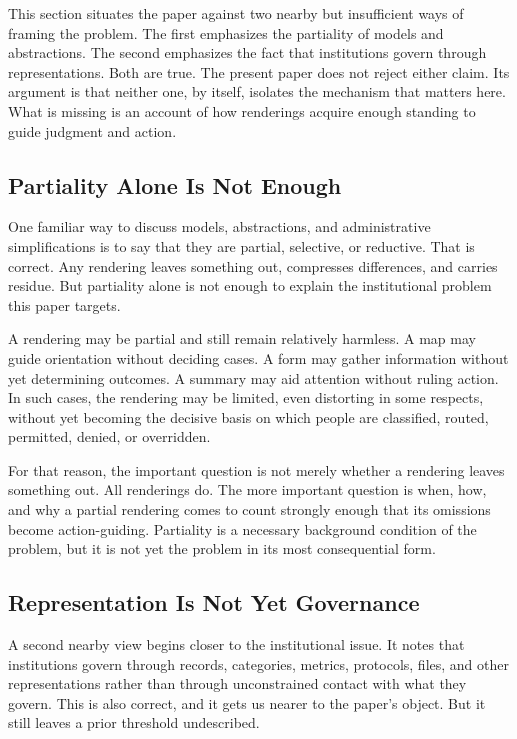 \documentclass[11pt]{article}
\begin{document}
This section situates the paper against two nearby but insufficient ways of framing the problem. The first emphasizes the partiality of models and abstractions. The second emphasizes the fact that institutions govern through representations. Both are true. The present paper does not reject either claim. Its argument is that neither one, by itself, isolates the mechanism that matters here. What is missing is an account of how renderings acquire enough standing to guide judgment and action.

\subsection{Partiality Alone Is Not Enough}

One familiar way to discuss models, abstractions, and administrative simplifications is to say that they are partial, selective, or reductive. That is correct. Any rendering leaves something out, compresses differences, and carries residue.\cite{Simon1996SciencesArtificial,FriggNguyen2020ModellingNature,Swanson2026ConstrainedDescribability} But partiality alone is not enough to explain the institutional problem this paper targets.

A rendering may be partial and still remain relatively harmless. A map may guide orientation without deciding cases. A form may gather information without yet determining outcomes. A summary may aid attention without ruling action. In such cases, the rendering may be limited, even distorting in some respects, without yet becoming the decisive basis on which people are classified, routed, permitted, denied, or overridden.

For that reason, the important question is not merely whether a rendering leaves something out. All renderings do. The more important question is when, how, and why a partial rendering comes to count strongly enough that its omissions become action-guiding. Partiality is a necessary background condition of the problem, but it is not yet the problem in its most consequential form.

\subsection{Representation Is Not Yet Governance}

A second nearby view begins closer to the institutional issue. It notes that institutions govern through records, categories, metrics, protocols, files, and other representations rather than through unconstrained contact with what they govern.\cite{BowkerStar1999SortingThingsOut,Scott1998SeeingLikeState,Porter1995TrustInNumbers,EspelandStevens1998Commensuration} This is also correct, and it gets us nearer to the paper's object. But it still leaves a prior threshold undescribed.
\end{document}
